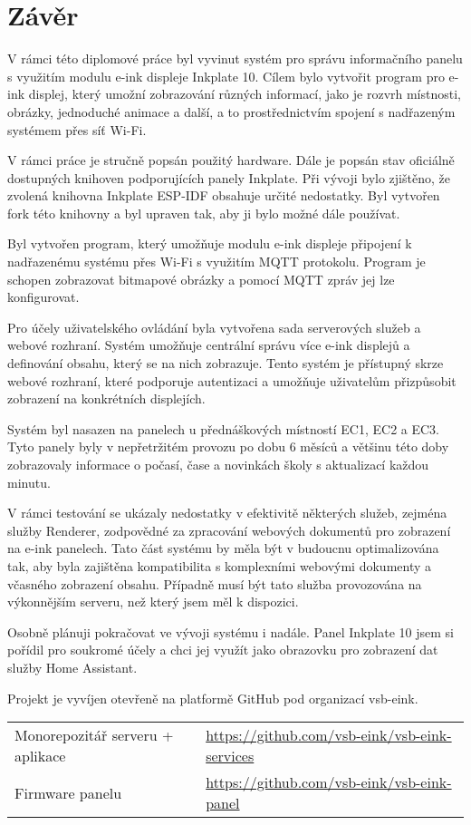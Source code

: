 \chapter{Závěr}

V rámci této diplomové práce byl vyvinut systém pro správu informačního panelu s využitím modulu e-ink displeje Inkplate 10. Cílem bylo vytvořit program pro e-ink displej, který umožní zobrazování různých informací, jako je rozvrh místnosti, obrázky, jednoduché animace a další, a to prostřednictvím spojení s nadřazeným systémem přes síť Wi-Fi.

V rámci práce je stručně popsán použitý hardware. Dále je popsán stav oficiálně dostupných knihoven podporujících panely Inkplate. Při vývoji bylo zjištěno, že zvolená knihovna Inkplate ESP-IDF obsahuje určité nedostatky. Byl vytvořen fork této knihovny a byl upraven tak, aby ji bylo možné dále používat.

Byl vytvořen program, který umožňuje modulu e-ink displeje připojení k nadřazenému systému přes Wi-Fi s využitím MQTT protokolu. Program je schopen zobrazovat bitmapové obrázky a pomocí MQTT zpráv jej lze konfigurovat.

Pro účely uživatelského ovládání byla vytvořena sada serverových služeb a webové rozhraní. Systém umožňuje centrální správu více e-ink displejů a definování obsahu, který se na nich zobrazuje. Tento systém je přístupný skrze webové rozhraní, které podporuje autentizaci a umožňuje uživatelům přizpůsobit zobrazení na konkrétních displejích.

Systém byl nasazen na panelech u přednáškových místností EC1, EC2 a EC3. Tyto panely byly v nepřetržitém provozu po dobu 6 měsíců a většinu této doby zobrazovaly informace o počasí, čase a novinkách školy s aktualizací každou minutu.

V rámci testování se ukázaly nedostatky v efektivitě některých služeb, zejména služby Renderer, zodpovědné za zpracování webových dokumentů pro zobrazení na e-ink panelech. Tato část systému by měla být v budoucnu optimalizována tak, aby byla zajištěna kompatibilita s komplexními webovými dokumenty a včasného zobrazení obsahu. Případně musí být tato služba provozována na výkonnějším serveru, než který jsem měl k dispozici.

Osobně plánuji pokračovat ve vývoji systému i nadále. Panel Inkplate 10 jsem si pořídil pro soukromé účely a chci jej využít jako obrazovku pro zobrazení dat služby Home Assistant\cite{HomeassistantCoreHouse_with_garden}.

\newpage
Projekt je vyvíjen otevřeně na platformě GitHub pod organizací vsb-eink.
\begin{table}[h]
    \begin{tabular}{ll}
        Monorepozitář serveru + aplikace & \url{https://github.com/vsb-eink/vsb-eink-services} \\
        Firmware panelu & \url{https://github.com/vsb-eink/vsb-eink-panel} \\
    \end{tabular}
\end{table}
